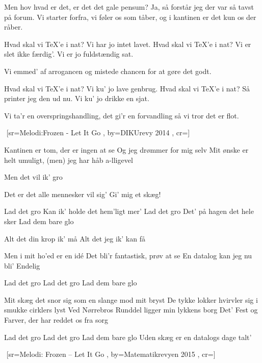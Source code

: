 \documentclass[pdftex,12pt]{article}
\begin{document}
\begin{songs}{}
\endverse
\beginverse
Men hov hvad er det, er det det gale pensum?
Ja, så forstår jeg der var så tavst på forum.
Vi starter forfra, vi føler os som tåber,
og i kantinen er det kun os der råber.

\endverse
\beginverse
Hvad skal vi \TeX'e i nat?
Vi har jo intet lavet.
Hvad skal vi \TeX'e i nat?
Vi er slet ikke færdig'.
Vi er jo fuldstændig sat.

\endverse
\beginverse
Vi emmed' af arrogancen og mistede chancen
for at gøre det godt.

\endverse
\beginverse
Hvad skal vi \TeX'e i nat?
Vi ku' jo lave genbrug.
Hvad skal vi \TeX'e i nat?
Så printer jeg den ud nu.
Vi ku' jo drikke en sjat.

\endverse
\beginverse
Vi ta'r en overspringshandling, det gi'r en forvandling
så vi tror det er flot.

\endverse
\endsong



﻿%
[sr={Melodi:Frozen - Let It Go}
,
by={DIKUrevy 2014}
,
cr={}]\hypertarget{Lad det gro}{}
\label{song70}

\beginverse
Kantinen er tom, der er ingen at se
Og jeg drømmer for mig selv
Mit ønske er helt umuligt, (men) jeg har håb a-lligevel

\endverse
\beginverse
Men det vil ik' gro

\endverse
\beginverse
Det er det alle mennesker vil sig'
Gi' mig et skæg!

\endverse
\beginverse
Lad det gro
Kan ik' holde det hem'ligt mer'
Lad det gro
Det' på hagen det hele sker
Lad dem bare glo

\endverse
\beginverse
Alt det din krop ik' må
Alt det jeg ik' kan få

\endverse
\beginverse
Men i mit ho'ed er en idé
Det bli'r fantastisk, prøv at se
En datalog kan jeg nu bli'
Endelig

\endverse
\beginverse
Lad det gro
Lad det gro
Lad dem bare glo

\endverse
\beginverse
Mit skæg det snor sig som en slange mod mit bryst
De tykke lokker hvirvler sig i smukke cirklers lyst
Ved Nørrebros Runddel ligger min lykkens borg
Det' Fest og Farver, der har reddet os fra sorg

\endverse
\beginverse
Lad det gro
Lad det gro
Lad dem bare glo
Uden skæg er en datalogs dage talt'

\endverse
\endsong



﻿%
[sr={Melodi: Frozen -- Let It Go}
,
by={Matematikrevyen 2015}
,
cr={}]\hypertarget{Statistik}{}
\label{song71}


\end{songs}
\end{document}
